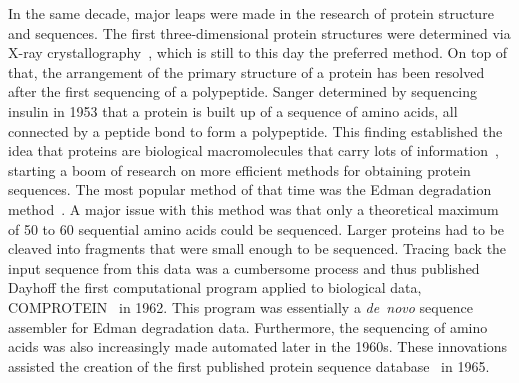 In the same decade, major leaps were made in the research of protein structure and sequences. The first three-dimensional protein structures were determined via X-ray crystallography~\cite{xray}, which is still to this day the preferred method. On top of that, the arrangement of the primary structure of a protein has been resolved after the first sequencing of a polypeptide. Sanger determined by sequencing ~\cite{insulin} insulin in 1953 that a protein is built up of a sequence of amino acids, all connected by a peptide bond to form a polypeptide. This finding established the idea that proteins are biological macromolecules that carry lots of information~\cite{primstruct}, starting a boom of research on more efficient methods for obtaining protein sequences. The most popular method of that time was the Edman degradation method~\cite{edman}. A major issue with this method was that only a theoretical maximum of 50 to 60 sequential amino acids could be sequenced. Larger proteins had to be cleaved into fragments that were small enough to be sequenced. Tracing back the input sequence from this data was a cumbersome process and thus published Dayhoff the first computational program applied to biological data, COMPROTEIN~\cite{comprotein} in 1962. This program was essentially a \mbox{\textit{de novo}} sequence assembler for Edman degradation data. Furthermore, the sequencing of amino acids was also increasingly made automated later in the 1960s. These innovations assisted the creation of the first published protein sequence database~\cite{atlas} in 1965. 

